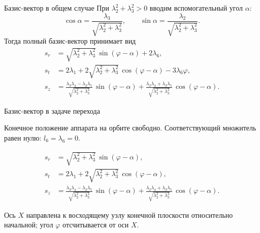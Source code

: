 \documentclass[11pt,aspectratio=169,t]{beamer}
\newcommand{\eqcompact}{\fontsize{10}{12}\selectfont}
\newcommand{\derivationmathspacing}{%
  \setlength{\abovedisplayskip}{2pt}%
  \setlength{\belowdisplayskip}{3pt}%
  \setlength{\abovedisplayshortskip}{2pt}%
  \setlength{\belowdisplayshortskip}{2pt}%
  \setlength{\jot}{2pt}}
\begin{document}
\begin{frame}{Базис-вектор в общем случае}
\relax
\derivationmathspacing
При $\lambda_2^2+\lambda_3^2>0$ вводим вспомогательный угол $\alpha$:
{\eqcompact\derivationmathspacing
\setlength{\jot}{0pt}
\[
\cos\alpha=\frac{\lambda_3}{\sqrt{\lambda_2^2+\lambda_3^2}},
 \qquad
 \sin\alpha=\frac{\lambda_2}{\sqrt{\lambda_2^2+\lambda_3^2}}.
\]
}
Тогда полный базис-вектор принимает вид
{\eqcompact\derivationmathspacing
\setlength{\jot}{0pt}
\[
\boxed{\begin{aligned}
 s_r&=\sqrt{\lambda_2^2+\lambda_3^2}\,\sin(\varphi-\alpha)+2\lambda_6,\\
 s_t&=2\lambda_1+2\sqrt{\lambda_2^2+\lambda_3^2}\,
                       \cos(\varphi-\alpha)-3\lambda_6\varphi,\\
 s_z&=\frac{\lambda_3\lambda_4-\lambda_2\lambda_5}
                {\sqrt{\lambda_2^2+\lambda_3^2}}\,\sin(\varphi-\alpha)+\frac{\lambda_2\lambda_4+\lambda_3\lambda_5}
                {\sqrt{\lambda_2^2+\lambda_3^2}}\,\cos(\varphi-\alpha).
\end{aligned}}
\]
}
\end{frame}

\begin{frame}{Базис-вектор в задаче перехода}
\relax
\derivationmathspacing
{\justifying
Конечное положение аппарата на орбите свободно.
Соответствующий множитель равен нулю: $l_6=\lambda_6=0$.
\par}
{\eqcompact\derivationmathspacing
\[
\boxed{\begin{aligned}
 s_r&=\sqrt{\lambda_2^2+\lambda_3^2}\,\sin(\varphi-\alpha),\\
 s_t&=2\lambda_1+2\sqrt{\lambda_2^2+\lambda_3^2}\,\cos(\varphi-\alpha),\\
 s_z&=\frac{\lambda_3\lambda_4-\lambda_2\lambda_5}
 {\sqrt{\lambda_2^2+\lambda_3^2}}\,\sin(\varphi-\alpha)
 +\frac{\lambda_2\lambda_4+\lambda_3\lambda_5}
 {\sqrt{\lambda_2^2+\lambda_3^2}}\,\cos(\varphi-\alpha).
\end{aligned}}
\]
}
\medskip
{\justifying
Ось $X$ направлена к восходящему узлу конечной плоскости относительно
начальной; угол $\varphi$ отсчитывается от оси $X$.
\par}
\end{frame}
\end{document}
